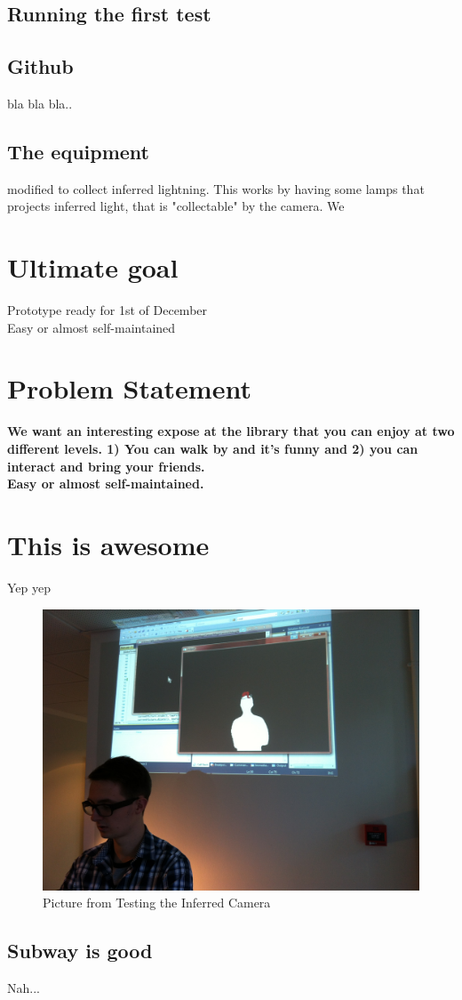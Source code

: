 \subsection{Running the first test}


\subsection{Github}
bla bla bla..

\subsection{The equipment} 
modified to collect inferred lightning. This works by having some lamps that projects inferred light, that is "collectable" by the camera. We 

\section{Ultimate goal}
Prototype ready for 1st of December\\
Easy or almost self-maintained
\section{Problem Statement}
      
\textbf{We want an interesting expose at the library that you can enjoy at two different levels. 1) You can walk by and it's funny and 2) you can interact and bring your friends.}\\
\textbf{Easy or almost self-maintained.}

\section{This is awesome}
Yep yep

\begin{figure}[htbp]
\centering
\includegraphics[width=1.00\textwidth]{Pictures/Test/IMG_1477.jpg}
\caption{Picture from Testing the Inferred Camera}
\label{fig:Picture from Testing the Inferred Camera}
\end{figure}

\subsection{Subway is good}
Nah...
